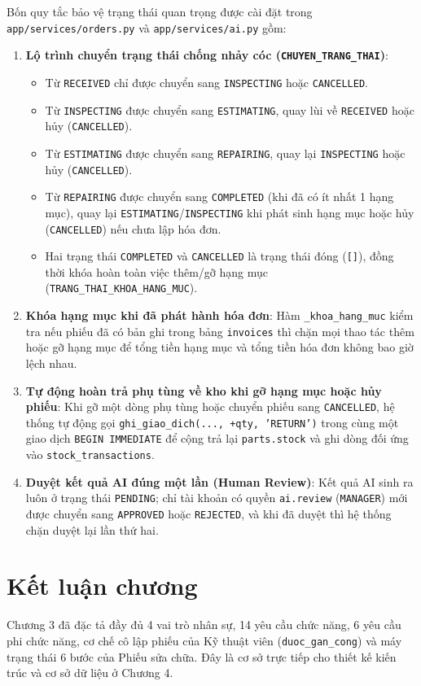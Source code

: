 Bốn quy tắc bảo vệ trạng thái quan trọng được cài đặt trong \texttt{app/services/orders.py} và \texttt{app/services/ai.py} gồm:
\begin{enumerate}[noitemsep,topsep=2pt]
  \item \textbf{Lộ trình chuyển trạng thái chống nhảy cóc (\texttt{CHUYEN\_TRANG\_THAI})}:
  \begin{itemize}[noitemsep,topsep=1pt]
    \item Từ \texttt{RECEIVED} chỉ được chuyển sang \texttt{INSPECTING} hoặc \texttt{CANCELLED}.
    \item Từ \texttt{INSPECTING} được chuyển sang \texttt{ESTIMATING}, quay lùi về \texttt{RECEIVED} hoặc hủy (\texttt{CANCELLED}).
    \item Từ \texttt{ESTIMATING} được chuyển sang \texttt{REPAIRING}, quay lại \texttt{INSPECTING} hoặc hủy (\texttt{CANCELLED}).
    \item Từ \texttt{REPAIRING} được chuyển sang \texttt{COMPLETED} (khi đã có ít nhất 1 hạng mục), quay lại \texttt{ESTIMATING}/\texttt{INSPECTING} khi phát sinh hạng mục hoặc hủy (\texttt{CANCELLED}) nếu chưa lập hóa đơn.
    \item Hai trạng thái \texttt{COMPLETED} và \texttt{CANCELLED} là trạng thái đóng (\texttt{[]}), đồng thời khóa hoàn toàn việc thêm/gỡ hạng mục (\texttt{TRANG\_THAI\_KHOA\_HANG\_MUC}).
  \end{itemize}
  \item \textbf{Khóa hạng mục khi đã phát hành hóa đơn}: Hàm \texttt{\_khoa\_hang\_muc} kiểm tra nếu phiếu đã có bản ghi trong bảng \texttt{invoices} thì chặn mọi thao tác thêm hoặc gỡ hạng mục để tổng tiền hạng mục và tổng tiền hóa đơn không bao giờ lệch nhau.
  \item \textbf{Tự động hoàn trả phụ tùng về kho khi gỡ hạng mục hoặc hủy phiếu}: Khi gỡ một dòng phụ tùng hoặc chuyển phiếu sang \texttt{CANCELLED}, hệ thống tự động gọi \texttt{ghi\_giao\_dich(..., +qty, 'RETURN')} trong cùng một giao dịch \texttt{BEGIN IMMEDIATE} để cộng trả lại \texttt{parts.stock} và ghi dòng đối ứng vào \texttt{stock\_transactions}.
  \item \textbf{Duyệt kết quả AI đúng một lần (Human Review)}: Kết quả AI sinh ra luôn ở trạng thái \texttt{PENDING}; chỉ tài khoản có quyền \texttt{ai.review} (\texttt{MANAGER}) mới được chuyển sang \texttt{APPROVED} hoặc \texttt{REJECTED}, và khi đã duyệt thì hệ thống chặn duyệt lại lần thứ hai.
\end{enumerate}

\section{Kết luận chương}

Chương 3 đã đặc tả đầy đủ 4 vai trò nhân sự, 14 yêu cầu chức năng, 6 yêu cầu phi chức năng, cơ chế cô lập phiếu của Kỹ thuật viên (\texttt{duoc\_gan\_cong}) và máy trạng thái 6 bước của Phiếu sửa chữa. Đây là cơ sở trực tiếp cho thiết kế kiến trúc và cơ sở dữ liệu ở Chương 4.

